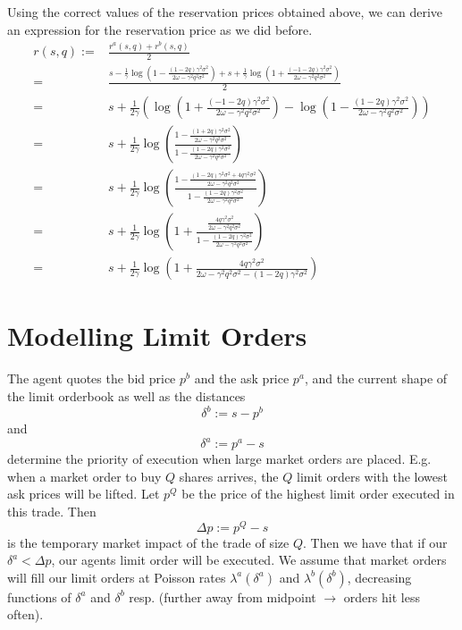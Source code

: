 Using the correct values of the reservation prices obtained above, we can derive an
expression for the reservation price as we did before.
\begin{align*}
    r(s,q):=&\frac{r^a(s,q)+r^b(s,q)}{2}\\
    =&\frac{s-\frac{1}{\gamma}\log\left(1-\frac{(1-2q)\gamma^2\sigma^2}{2\omega-\gamma^2q^2\sigma^2}\right)+s+\frac{1}{\gamma}\log\left(1+\frac{(-1-2q)\gamma^2\sigma^2}{2\omega-\gamma^2q^2\sigma^2}\right)}{2}\\
    =&s+\frac{1}{2\gamma}\left(\log\left(1+\frac{(-1-2q)\gamma^2\sigma^2}{2\omega-\gamma^2q^2\sigma^2}\right)-\log\left(1-\frac{(1-2q)\gamma^2\sigma^2}{2\omega-\gamma^2q^2\sigma^2}\right)\right)\\
    =&s+\frac{1}{2\gamma}\log\left(\frac{1-\frac{(1+2q)\gamma^2\sigma^2}{2\omega-\gamma^2q^2\sigma^2}}{1-\frac{(1-2q)\gamma^2\sigma^2}{2\omega-\gamma^2q^2\sigma^2}}\right)\\
    =&s+\frac{1}{2\gamma}\log\left(\frac{1-\frac{(1-2q)\gamma^2\sigma^2+4q\gamma^2\sigma^2}{2\omega-\gamma^2q^2\sigma^2}}{1-\frac{(1-2q)\gamma^2\sigma^2}{2\omega-\gamma^2q^2\sigma^2}}\right)\\
    =&s+\frac{1}{2\gamma}\log\left(1+\frac{\frac{4q\gamma^2\sigma^2}{2\omega-\gamma^2q^2\sigma^2}}{1-\frac{(1-2q)\gamma^2\sigma^2}{2\omega-\gamma^2q^2\sigma^2}}\right)\\
    =&s+\frac{1}{2\gamma}\log\left(1+\frac{4q\gamma^2\sigma^2}{2\omega-\gamma^2q^2\sigma^2-(1-2q)\gamma^2\sigma^2}\right)
\end{align*}

\section{Modelling Limit Orders}\label{sec:3.5}
The agent quotes the bid price $p^b$ and the ask price $p^a$, and the current shape of the limit orderbook as well as the distances 
$$\delta^b:=s-p^b$$
and 
$$\delta^a:=p^a-s$$ 
determine the priority of execution when large market orders are placed. 
E.g. when a market order to buy $Q$ shares arrives, the $Q$ limit orders with the lowest ask prices will be lifted. 
Let $p^Q$ be the price of the highest limit order executed in this trade. Then 
$$\Delta p:=p^Q-s$$ 
is the temporary market impact of the trade of size $Q.$ 
Then we have that if our $\delta^a < \Delta p$, our agents limit order will be executed. We assume that market orders will fill our limit orders at Poisson rates $\lambda^a(\delta^a)$ and $\lambda^b(\delta^b)$, decreasing functions of $\delta^a$ and $\delta^b$ resp. 
(further away from midpoint $\rightarrow$ orders hit less often).

